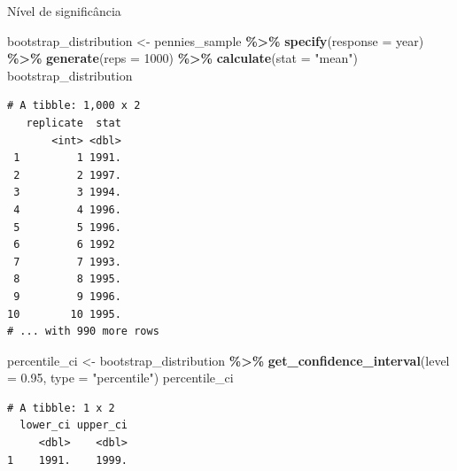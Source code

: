 \documentclass[
  9pt,
  ignorenonframetext,
  aspectratio=169]{beamer}
\newenvironment{Shaded}{\begin{snugshade}}{\end{snugshade}}
\newcommand{\DataTypeTok}[1]{\textcolor[rgb]{0.13,0.29,0.53}{#1}}
\newcommand{\DecValTok}[1]{\textcolor[rgb]{0.00,0.00,0.81}{#1}}
\newcommand{\FloatTok}[1]{\textcolor[rgb]{0.00,0.00,0.81}{#1}}
\newcommand{\KeywordTok}[1]{\textcolor[rgb]{0.13,0.29,0.53}{\textbf{#1}}}
\newcommand{\NormalTok}[1]{#1}
\newcommand{\OperatorTok}[1]{\textcolor[rgb]{0.81,0.36,0.00}{\textbf{#1}}}
\newcommand{\StringTok}[1]{\textcolor[rgb]{0.31,0.60,0.02}{#1}}
\begin{document}
\begin{frame}[fragile]{Nível de significância}
\protect\hypertarget{nuxedvel-de-significuxe2ncia}{}
\begin{Shaded}
\begin{Highlighting}[]
\NormalTok{bootstrap\_distribution \textless{}{-}}\StringTok{ }\NormalTok{pennies\_sample }\OperatorTok{\%\textgreater{}\%}\StringTok{ }
\StringTok{  }\KeywordTok{specify}\NormalTok{(}\DataTypeTok{response =}\NormalTok{ year) }\OperatorTok{\%\textgreater{}\%}\StringTok{ }
\StringTok{  }\KeywordTok{generate}\NormalTok{(}\DataTypeTok{reps =} \DecValTok{1000}\NormalTok{) }\OperatorTok{\%\textgreater{}\%}\StringTok{ }
\StringTok{  }\KeywordTok{calculate}\NormalTok{(}\DataTypeTok{stat =} \StringTok{"mean"}\NormalTok{)}
\NormalTok{bootstrap\_distribution}
\end{Highlighting}
\end{Shaded}

\begin{verbatim}
# A tibble: 1,000 x 2
   replicate  stat
       <int> <dbl>
 1         1 1991.
 2         2 1997.
 3         3 1994.
 4         4 1996.
 5         5 1996.
 6         6 1992 
 7         7 1993.
 8         8 1995.
 9         9 1996.
10        10 1995.
# ... with 990 more rows
\end{verbatim}
\end{frame}

\begin{frame}[fragile]{}
\protect\hypertarget{section}{}
\begin{Shaded}
\begin{Highlighting}[]
\NormalTok{percentile\_ci \textless{}{-}}\StringTok{ }\NormalTok{bootstrap\_distribution }\OperatorTok{\%\textgreater{}\%}\StringTok{ }
\StringTok{  }\KeywordTok{get\_confidence\_interval}\NormalTok{(}\DataTypeTok{level =} \FloatTok{0.95}\NormalTok{, }\DataTypeTok{type =} \StringTok{"percentile"}\NormalTok{)}
\NormalTok{percentile\_ci}
\end{Highlighting}
\end{Shaded}

\begin{verbatim}
# A tibble: 1 x 2
  lower_ci upper_ci
     <dbl>    <dbl>
1    1991.    1999.
\end{verbatim}
\end{frame}
\end{document}
